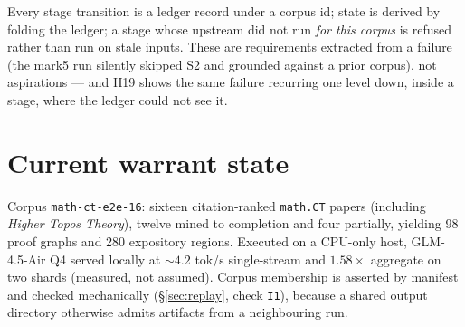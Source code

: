 \documentclass[11pt]{article}
\newcommand{\hz}[1]{\textsf{#1}}
\begin{document}
Every stage transition is a ledger record under a corpus id; state is derived by
folding the ledger; a stage whose upstream did not run \emph{for this corpus}
is refused rather than run on stale inputs. These are requirements extracted
from a failure (the mark5 run silently skipped S2 and grounded against a prior
corpus), not aspirations --- and \hz{H19} shows the same failure recurring one
level down, inside a stage, where the ledger could not see it.

\section{Current warrant state}

Corpus \texttt{math-ct-e2e-16}: sixteen citation-ranked \texttt{math.CT} papers
(including \emph{Higher Topos Theory}), twelve mined to completion and four
partially, yielding 98 proof graphs and 280 expository regions. Executed on a
CPU-only host, GLM-4.5-Air Q4 served locally at ${\sim}4.2$ tok/s single-stream
and $1.58\times$ aggregate on two shards (measured, not assumed). Corpus
membership is asserted by manifest and checked mechanically
(\S\ref{sec:replay}, check \texttt{I1}), because a shared output directory
otherwise admits artifacts from a neighbouring run.
\end{document}
